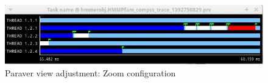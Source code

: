 \begin{figure}[ht!]
  \centering
    \includegraphics[width=1.0\textwidth]{./Sections/3_Visualization/Figures/6_2.jpeg}
    \caption{Paraver view adjustment: Zoom configuration}
\end{figure}
